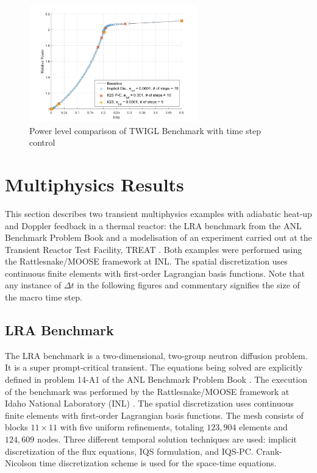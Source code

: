 \documentclass{elsarticle}
\newcommand{\iqspc}{IQS-PC\xspace}
\begin{document}
\begin{figure}[!htbp]
\centering
\includegraphics[height=2in]{figures/TWIGL_power_plot_dt2.png}
\caption{Power level comparison of TWIGL Benchmark with time step control}
\label{fig:TWIGL_power_dt2}
\end{figure}

\section{Multiphysics Results}

This section describes two transient multiphysics examples with adiabatic heat-up and Doppler feedback in a thermal reactor: the LRA benchmark from the  ANL Benchmark Problem Book \cite{ANL_BPB} 
and a modelisation of an experiment carried out at the Transient Reactor Test Facility, TREAT \cite{mammoth, Tran15}. 
Both examples were performed using the Rattlesnake/MOOSE framework at INL. The spatial discretization uses continuous finite elements with first-order Lagrangian basis functions.
Note that any instance of $\Delta t$ in the following figures and commentary signifies the size of the macro time step.

\subsection{LRA Benchmark}

The LRA benchmark is a two-dimensional, two-group neutron diffusion problem.  
It is a super prompt-critical transient. The equations being solved are explicitly defined in problem 14-A1 of the ANL Benchmark Problem Book \cite{ANL_BPB}. The execution of the benchmark was performed by the Rattlesnake/MOOSE framework at Idaho National Laboratory (INL) \cite{Rattlesnake_user}.  The spatial discretization uses continuous finite elements with first-order Lagrangian basis functions. The mesh consists of blocks $11\times 11$ with five uniform refinements, totaling $123,904$ elements and $124,609$ nodes. Three different temporal solution techniques are used: implicit discretization of the flux equations, IQS formulation, and \iqspc. Crank-Nicolson time discretization scheme is used for the space-time equations. 
\end{document}
